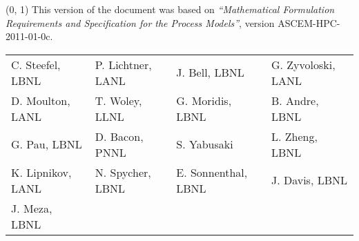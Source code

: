%
%  
%



\DocDate{\today}




\ASCEMcover

\begin{textblock}{12}(0, 1)
This version of the document was based on 
\emph{``Mathematical Formulation Requirements and Specification for the Process Models''},
version ASCEM-HPC-2011-01-0c.\\

\begin{tabular}{llll}
  C. Steefel, LBNL &
  P. Lichtner, LANL & 
  J. Bell, LBNL &
  G. Zyvoloski, LANL
  \\[-3pt]
  D. Moulton, LANL & 
  T. Woley, LLNL &
  G. Moridis, LBNL &
  B. Andre, LBNL 
  \\[-3pt]
  G. Pau, LBNL &
  D. Bacon, PNNL &
  S. Yabusaki &
  L. Zheng, LBNL
  \\[-3pt]
  K. Lipnikov, LANL &
  N. Spycher, LBNL &
  E. Sonnenthal, LBNL &
  J. Davis, LBNL
  \\[-3pt]
  J. Meza, LBNL & & & \\
\end{tabular}
\end{textblock}

\ASCEMdisclaimer

